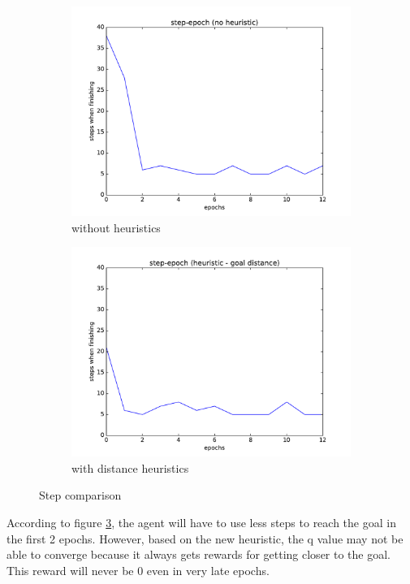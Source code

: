 \documentclass{article}
\begin{document}
\begin{figure}
\begin{subfigure}{.5\textwidth}
  \centering
  \includegraphics[width=.9\linewidth]{figures/Exp1_Q_Update_Heuristic/Steps_Heuristic_0_NoHeuristic.pdf}
  \caption{without heuristics}
  \label{fig:20171217_Q_NoHeuristic}
\end{subfigure}%
\begin{subfigure}{.5\textwidth}
  \centering
  \includegraphics[width=.9\linewidth]{figures/Exp1_Q_Update_Heuristic/Steps_Heuristic_1_Distance.pdf}
  \caption{with distance heuristics}
  \label{fig:20171217_Q_Heuristic_Dist}
\end{subfigure}
\caption{Step comparison}
\label{fig:20171217_step_comparison}
\end{figure}
According to figure \ref{fig:20171217_step_comparison}, the agent will have to use less steps to reach the goal in the first 2 epochs. However, based on the new heuristic, the q value may not be able to converge because it always gets rewards for getting closer to the goal. This reward will never be 0 even in very late epochs.
\end{document}
